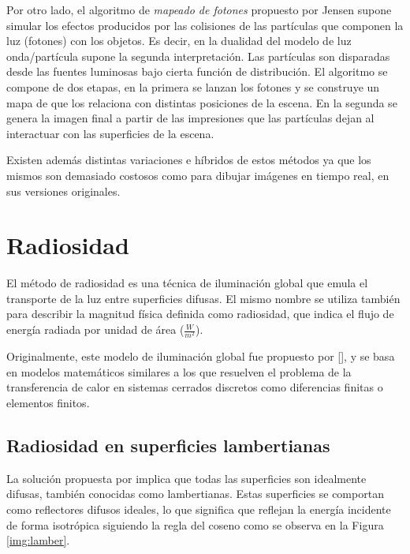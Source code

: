 Por otro lado, el algoritmo de \textit{mapeado de fotones} propuesto por Jensen \cite{Jensen} supone simular los efectos producidos por las colisiones de las partículas que componen la luz (fotones) con los objetos. Es decir, en la dualidad del modelo de luz onda/partícula supone la segunda interpretación. Las partículas son disparadas desde las fuentes luminosas bajo cierta función de distribución. El algoritmo se compone de dos etapas, en la primera se lanzan los fotones y se construye un mapa de que los relaciona con distintas posiciones de la escena. En la segunda se genera la imagen final a partir de las impresiones que las partículas dejan al interactuar con las superficies de la escena.

Existen además distintas variaciones e híbridos de estos métodos ya que los mismos son demasiado costosos como para dibujar imágenes en tiempo real, en sus versiones originales.

\section{Radiosidad}
\label{sec:radiosidad}

El método de radiosidad es una técnica de iluminación global que emula el transporte de la luz entre superficies difusas. El mismo nombre se utiliza también para describir la magnitud física definida como radiosidad, que indica el flujo de energía radiada por unidad de área ($\frac{W}{m^{2}}$).

Originalmente, este modelo de iluminación global fue propuesto por [\citeauthor{Goral}], y se basa en modelos matemáticos similares a los que resuelven el problema de la transferencia de calor en sistemas cerrados discretos como diferencias finitas o elementos finitos.

\subsection{Radiosidad en superficies lambertianas}

La solución propuesta por \citeauthor{Goral} implica que todas las superficies son idealmente difusas, también conocidas como lambertianas. Estas superficies se comportan como reflectores difusos ideales, lo que significa que reflejan la energía incidente de forma isotrópica siguiendo la regla del coseno como se observa en la Figura \ref{img:lamber}.

